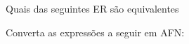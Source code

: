 \documentclass[12pt]{exam}
\def\ve{\varepsilon}
\def\emptyset{\varnothing}
\begin{document}
\begin{questions}
\begin{parts}
\end{parts}




\question Quais das seguintes ER são equivalentes




\question Converta as expressões a seguir em AFN:















\end{questions}
\end{document}
